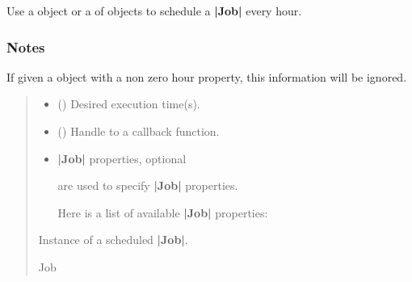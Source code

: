 \documentclass[letterpaper,10pt,english]{sphinxmanual}
\begin{document}
\begin{fulllineitems}
\begin{fulllineitems}
\sphinxAtStartPar
Use a  object or a  of  objects
to schedule a {\color{red}\bfseries{}|Job|} every hour.
\subsubsection*{Notes}

\sphinxAtStartPar
If given a  object with a non zero hour property, this information
will be ignored.
\begin{quote}\begin{description}
\begin{itemize}
\item {} 
\sphinxAtStartPar
{} () \textendash{} Desired execution time(s).

\item {} 
\sphinxAtStartPar
{} (\sphinxstyleliteralemphasis{\sphinxupquote{{[}}}\sphinxstyleliteralemphasis{\sphinxupquote{, }}\sphinxstyleliteralemphasis{\sphinxupquote{{]}}}) \textendash{} Handle to a callback function.

\item {} 
\sphinxAtStartPar
{} \textendash{} 
\sphinxAtStartPar
{\color{red}\bfseries{}|Job|} properties, optional

\sphinxAtStartPar
{} are used to specify {\color{red}\bfseries{}|Job|} properties.

\sphinxAtStartPar
Here is a list of available {\color{red}\bfseries{}|Job|} properties:


\end{itemize}

\sphinxAtStartPar
Instance of a scheduled {\color{red}\bfseries{}|Job|}.

\sphinxAtStartPar
Job

\end{description}\end{quote}

\end{fulllineitems}


\end{fulllineitems}
\end{document}
